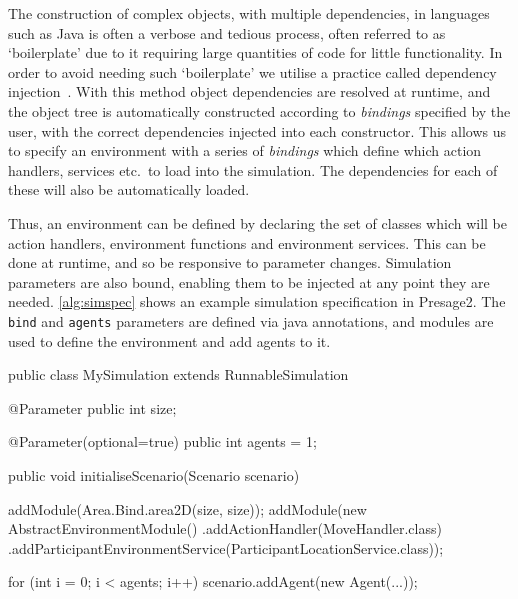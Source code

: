 The construction of complex objects, with multiple dependencies, in languages
such as Java is often a verbose and tedious process, often referred to as 
`boilerplate' due to it requiring large quantities of code for little
functionality. In order to avoid needing such `boilerplate' we utilise a
practice called dependency injection~\citep{vanbrabant2008}. With this method
object dependencies are resolved at runtime, and the object tree is
automatically constructed according to \emph{bindings} specified by the user, with the
correct dependencies injected into each constructor. This allows us to specify
an environment with a series of \emph{bindings} which define which action
handlers, services etc.\ to load into the simulation. The dependencies for each of
these will also be automatically loaded.


Thus, an environment can be defined by declaring the set of classes which will
be action handlers, environment functions and environment services. This can
be done at runtime, and so be responsive to parameter changes. Simulation
parameters are also bound, enabling them to be injected at any point they are
needed. \autoref{alg:simspec} shows an example simulation specification in
Presage2. The \texttt{bind} and \texttt{agents} parameters are defined via
java annotations, and modules are used to define the environment and add
agents to it.

\begin{java}[caption={Specification of a simulation and parameters in Presage2},label=alg:simspec]
public class MySimulation extends RunnableSimulation {
	@Parameter
	public int size;

	@Parameter(optional=true)
	public int agents = 1;

	public void initialiseScenario(Scenario scenario) {
		addModule(Area.Bind.area2D(size, size));
		addModule(new AbstractEnvironmentModule()
			.addActionHandler(MoveHandler.class)
			.addParticipantEnvironmentService(ParticipantLocationService.class));

		for (int i = 0; i < agents; i++) {
			scenario.addAgent(new Agent(...));
		}
	}
}
\end{java}

